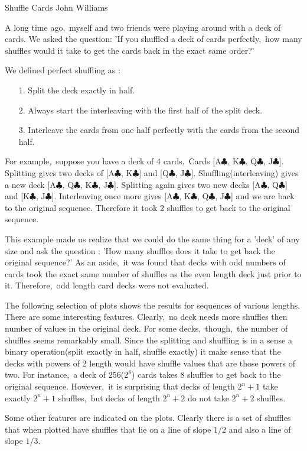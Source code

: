 \documentclass[11pt]{article}
\begin{document}
\pagestyle{plain}



\begin{center}
  Shuffle Cards
  John Williams\\
\end{center}

A long time ago,\ myself and two friends were playing around with a deck of cards.  We asked
the question:  'If you shuffled a deck of cards perfectly,\ how many shuffles would it take to
get the cards back in the exact same order?'

We defined perfect shuffling as :

\begin{itemize}
\item[1.]  Split the deck exactly in half.
\item[2.]  Always start the interleaving with the first half of the split deck.
\item[3.] Interleave the cards from one half perfectly with the cards from the second half.
\end{itemize}

For example,\ suppose you have a deck of 4 cards,\ Cards [A$\!\clubsuit$, K$\!\clubsuit$,
Q$\!\clubsuit$, J$\!\clubsuit$].  Splitting gives two decks of [A$\!\clubsuit$, K$\!\clubsuit$]
and [Q$\!\clubsuit$, J$\!\clubsuit$].  Shuffling(interleaving) gives a new deck
[A$\!\clubsuit$, Q$\!\clubsuit$, K$\!\clubsuit$, J$\!\clubsuit$].  Splitting again gives two
new decks [A$\!\clubsuit$, Q$\!\clubsuit$] and [K$\!\clubsuit$, J$\!\clubsuit$].  Interleaving
once more gives [A$\!\clubsuit$, K$\!\clubsuit$, Q$\!\clubsuit$, J$\!\clubsuit$] and we are
back to the original sequence.  Therefore it took 2 shuffles to get back to the original
sequence.

This example made us realize that we could do the same thing for a 'deck' of any size and ask
the question : 'How many shuffles does it take to get back the original sequence?'  As an
aside,\ it was found that decks with odd numbers of cards took the exact same number of
shuffles as the even length deck just prior to it.  Therefore,\ odd length card decks were not
evaluated. 

The following selection of plots shows the results for sequences of various lengths.  There are
some interesting features.  Clearly,\ no deck needs more shuffles then number of values in the
original deck.  For some decks,\ though,\ the number of shuffles seems remarkably small.  Since
the splitting and shuffling is in a sense a binary operation(split exactly in half, shuffle
exactly) it make sense that the decks with powers of 2 length would have shuffle values that
are those powers of two.  For instance,\ a deck of 256($2^{8}$) cards takes 8 shuffles to get
back to the original sequence.  However,\ it is surprising that decks of length $2^{n} + 1$
take exactly $2^{n} + 1$ shuffles,\ but decks of length $2^{n} + 2$ do not take $2^{n} + 2$
shuffles.

Some other features are indicated on the plots.  Clearly there is a set of shuffles that when
plotted have shuffles that lie on a line of slope $1/2$ and also a line of slope $1/3$.  
\end{document}
